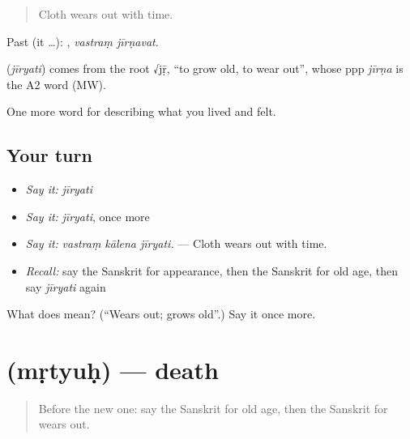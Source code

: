 \begin{quote}
Cloth wears out with time.
\end{quote}

Past (it …):  , \emph{vastraṃ jīrṇavat}.

\begin{cousinweb}
\textbf{} (\emph{jīryati}) comes from the root √jṝ, \textquotedblleft{}to grow old, to wear out\textquotedblright{}, whose ppp \emph{jīrṇa} is the A2 word \textbf{} (MW).
\end{cousinweb}

\begin{grammarlens}[title={What you've built}]
One more word for describing what you lived and felt.
\end{grammarlens}

\subsection*{Your turn}
\begin{itemize}
\raggedright
  \item \emph{Say it:} \emph{jīryati}
  \item \emph{Say it:} \emph{jīryati}, once more
  \item \emph{Say it:} \emph{vastraṃ kālena jīryati.} — Cloth wears out with time.
  \item \emph{Recall:} say the Sanskrit for appearance, then the Sanskrit for old age, then say \emph{jīryati} again
\end{itemize}

\begin{tcolorbox}[breakable,colback=teal!4,colframe=teal!35!black,title={Before you move on}]
What does  mean? (\textquotedblleft{}Wears out; grows old\textquotedblright{}.) Say it once more.
\end{tcolorbox}
\section[\texorpdfstring{\sk{मृत्युः} (mṛtyuḥ)}{मृत्युः (mṛtyuḥ)}]{ (mṛtyuḥ) — death}

\label{lesson:SA-C491-mrtyuh}



\begin{quote}
Before the new one: say the Sanskrit for old age, then the Sanskrit for wears out.
\end{quote}

